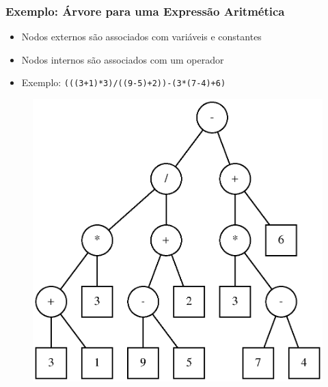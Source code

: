 \documentclass[aspectratio=169]{beamer}
\begin{document}
\begin{frame}\frametitle{Exemplo: Árvore para uma Expressão Aritmética}
\begin{itemize}
	\item Nodos externos são associados com variáveis e constantes
	\item Nodos internos são associados com um operador
	\item Exemplo: \texttt{(((3+1)*3)/((9-5)+2))-(3*(7-4)+6)}
\end{itemize}
\begin{figure}[h]
	\centering
	\includegraphics[height=0.55\paperheight]{imagens/arvore_binaria09-expressao.eps}
\end{figure}
\end{frame}
\end{document}
